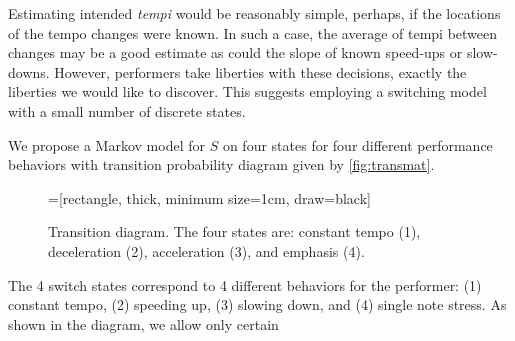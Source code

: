 \documentclass[aoas]{imsart}
\begin{document}
Estimating intended {\em tempi} would be reasonably simple, perhaps, 
if the locations of the tempo changes were known. In such a case,
the average of tempi between changes may be a good estimate as
could the slope of known speed-ups or slow-downs. However, performers
take liberties with these decisions, exactly the liberties we would
like to discover. This suggests employing a switching model with a
small number of discrete states.

We propose a Markov model for $S$ on four
states for four different performance behaviors
with transition probability
diagram given by \autoref{fig:transmat}.
\begin{figure}[tb!]
  \centering
  =[rectangle,
  thick, minimum size=1cm, draw=black]
  \caption{Transition diagram. The four states are: constant tempo
    (1), deceleration (2), acceleration (3), and emphasis (4).\label{fig:transmat}}
\end{figure}
The 4 switch states correspond to 4 different behaviors for the
performer: (1) constant tempo, (2) speeding up, (3) slowing down, and
(4) single note stress. As shown in the diagram, we allow only certain
\end{document}
